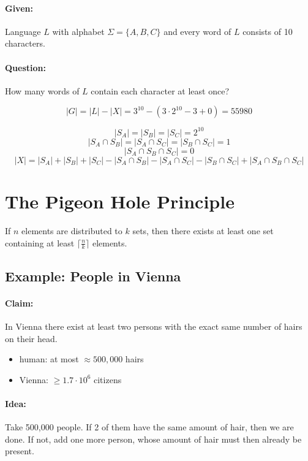 \documentclass[11pt]{article}
\begin{document}
\paragraph{Given:} Language $ L $ with alphabet $ \Sigma = \{ A, B, C \} $ and every word of $ L $ consists of 10 characters.

\paragraph{Question:} How many words of $ L $ contain each character at least once?

\[ | G | = | L | - | X | = 3^{10} - (3 \cdot 2^{10} - 3 + 0) = 55980 \]

\[ | S_A | = | S_B | = | S_C | = 2^{10} \]
\[ | S_A \cap S_B | = | S_A \cap S_C | = | S_B \cap S_C | = 1 \]
\[ | S_A \cap S_B \cap S_C | = 0 \]
\[ | X | = | S_A | + | S_B | + | S_C | - | S_A \cap S_B |  - | S_A \cap S_C | - | S_B \cap S_C | + | S_A \cap S_B \cap S_C | \]

\section{The Pigeon Hole Principle}

If $ n $ elements are distributed to $ k $ sets, then there exists at least one set containing at least $ \lceil \frac{n}{k} \rceil $ elements.

\subsection{Example: People in Vienna}

\paragraph{Claim:} In Vienna there exist at least two persons with the exact same number of hairs on their head.

\begin{itemize}
\item human: at most $ \approx 500,000 $ hairs
\item Vienna: $ \geq 1.7 \cdot 10^6 $ citizens
\end{itemize}

\paragraph{Idea:} Take 500,000 people. If 2 of them have the same amount of hair, then we are done. If not, add one more person, whose amount of hair must then already be present.
\end{document}
